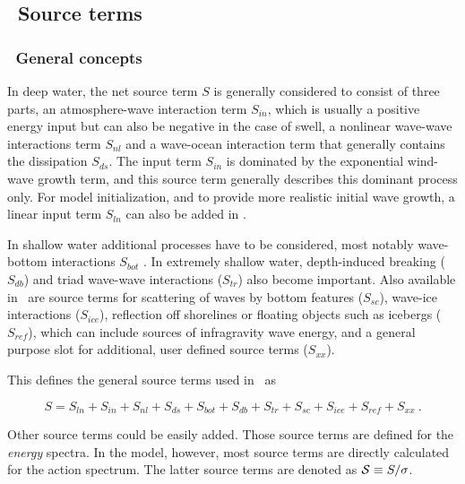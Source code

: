 \vssub
\subsection{~Source terms}
\vsssub
\subsubsection{~General concepts}
\vsssub

In deep water, the net source term $S$ is generally considered to consist of
three parts, an atmosphere-wave interaction term $S_{in}$, which 
is usually a positive energy input but can also be negative in the case of swell, a nonlinear wave-wave
interactions term $S_{nl}$ and a wave-ocean interaction term that generally contains the dissipation 
$S_{ds}$. The input term $S_{in}$ is dominated by the
exponential wind-wave growth term, and this source term generally describes this
dominant process only. For model initialization, and to provide more realistic
initial wave growth, a linear input term $S_{ln}$ can also be added in
\ws.

In shallow water additional processes have to be considered, most notably
wave-bottom interactions $S_{bot}$ \cite[e.g.,][]{pro:Sea78}. In extremely
shallow water, depth-induced breaking ($S_{db}$) and triad wave-wave
interactions ($S_{tr}$) also become important. Also available in \ws\ are source
terms for scattering of waves by bottom features ($S_{sc}$), wave-ice
interactions ($S_{ice}$), reflection off shorelines or floating objects such
as icebergs ($S_{ref}$), which can include sources of infragravity wave energy, and a general purpose slot for additional, user
defined source terms ($S_{xx}$).

This defines the general source terms used in \ws\ as


\begin{equation}
S = S_{ln} + S_{in} + S_{nl} + S_{ds} + S_{bot} + S_{db} + S_{tr} +
    S_{sc} + S_{ice} + S_{ref} + S_{xx}\: .
\label{eq:general_st}
\end{equation}

\noindent
Other source terms could be easily added. Those source terms are defined for the
{\em energy} spectra. In the model, however, most source terms are directly
calculated for the action spectrum. The latter source terms are denoted as
${\cal S} \equiv S/\sigma$.

